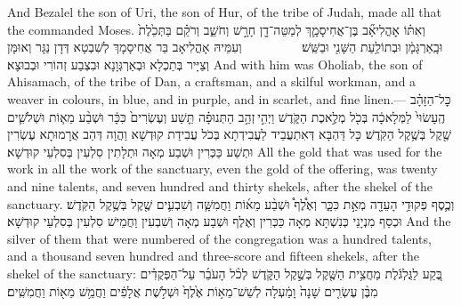 {And Bezalel the son of Uri, the son of Hur, of the tribe of Judah, made all that the \lord\space commanded Moses.}{}
{וְאִתּ֗וֹ אׇהֳלִיאָ֞ב בֶּן־אֲחִיסָמָ֛ךְ לְמַטֵּה־דָ֖ן חָרָ֣שׁ וְחֹשֵׁ֑ב וְרֹקֵ֗ם בַּתְּכֵ֙לֶת֙ וּבָֽאַרְגָּמָ֔ן וּבְתוֹלַ֥עַת הַשָּׁנִ֖י וּבַשֵּֽׁשׁ׃ \setuma         }
{וְעִמֵּיהּ אָהֳלִיאָב בַּר אֲחִיסָמָךְ לְשִׁבְטָא דְּדָן נַגָּר וְאוּמָּן וְצַיָּיר בְּתַכְלָא וּבְאַרְגְּוָנָא וּבִצְבַע זְהוֹרִי וּבְבוּצָא׃}
{And with him was Oholiab, the son of Ahisamach, of the tribe of Dan, a craftsman, and a skilful workman, and a weaver in colours, in blue, and in purple, and in scarlet, and fine linen.—}{}
{כׇּל־הַזָּהָ֗ב הֶֽעָשׂוּי֙ לַמְּלָאכָ֔ה בְּכֹ֖ל מְלֶ֣אכֶת הַקֹּ֑דֶשׁ וַיְהִ֣י \legarmeh  זְהַ֣ב הַתְּנוּפָ֗ה תֵּ֤שַׁע וְעֶשְׂרִים֙ כִּכָּ֔ר וּשְׁבַ֨ע מֵא֧וֹת וּשְׁלֹשִׁ֛ים שֶׁ֖קֶל בְּשֶׁ֥קֶל הַקֹּֽדֶשׁ׃
}
{כָּל דַּהְבָּא דְּאִתְעֲבֵיד לַעֲבִידְתָא בְּכֹל עֲבִידַת קוּדְשָׁא וַהֲוָה דְּהַב אֲרָמוּתָא עֶשְׂרִין וּתְשַׁע כַּכְּרִין וּשְׁבַע מְאָה וּתְלָתִין סִלְעִין בְּסִלְעֵי קוּדְשָׁא׃}
{All the gold that was used for the work in all the work of the sanctuary, even the gold of the offering, was twenty and nine talents, and seven hundred and thirty shekels, after the shekel of the sanctuary.}{}
{וְכֶ֛סֶף פְּקוּדֵ֥י הָעֵדָ֖ה מְאַ֣ת כִּכָּ֑ר וְאֶ֩לֶף֩ וּשְׁבַ֨ע מֵא֜וֹת וַחֲמִשָּׁ֧ה וְשִׁבְעִ֛ים שֶׁ֖קֶל בְּשֶׁ֥קֶל הַקֹּֽדֶשׁ׃}
{וּכְסַף מִנְיָנֵי כְּנִשְׁתָּא מְאָה כַּכְּרִין וְאֶלֶף וּשְׁבַע מְאָה וְשִׁבְעִין וַחֲמֵישׁ סִלְעִין בְּסִלְעֵי קוּדְשָׁא׃}
{And the silver of them that were numbered of the congregation was a hundred talents, and a thousand seven hundred and three-score and fifteen shekels, after the shekel of the sanctuary:}{}
{בֶּ֚קַע לַגֻּלְגֹּ֔לֶת מַחֲצִ֥ית הַשֶּׁ֖קֶל בְּשֶׁ֣קֶל הַקֹּ֑דֶשׁ לְכֹ֨ל הָעֹבֵ֜ר עַל־הַפְּקֻדִ֗ים מִבֶּ֨ן עֶשְׂרִ֤ים שָׁנָה֙ וָמַ֔עְלָה לְשֵׁשׁ־מֵא֥וֹת אֶ֙לֶף֙ וּשְׁלֹ֣שֶׁת אֲלָפִ֔ים וַחֲמֵ֥שׁ מֵא֖וֹת וַחֲמִשִּֽׁים׃
}
